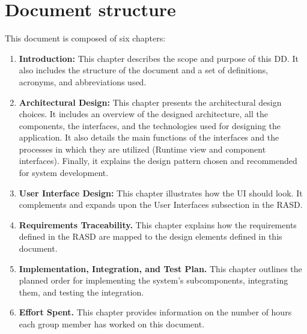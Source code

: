 \pagebreak
\section{Document structure}
This document is composed of six chapters:
\begin{enumerate}
    \item \textbf{ Introduction:} This chapter describes the scope and purpose of this DD. It also includes the structure of the document and a set of definitions, acronyms, and abbreviations used.
    \item \textbf{ Architectural Design:} This chapter presents the architectural design choices. It includes an overview of the designed architecture, all the components, the interfaces, and the technologies used for designing the application. It also details the main functions of the interfaces and the processes in which they are utilized (Runtime view and component interfaces). Finally, it explains the design pattern chosen and recommended for system development.
    \item \textbf{User Interface Design:} This chapter illustrates how the UI should look. It complements and expands upon the User Interfaces subsection in the RASD.
    \item \textbf{Requirements Traceability.} This chapter explains how the requirements defined in the RASD are mapped to the design elements defined in this document.
    \item \textbf{Implementation, Integration, and Test Plan.} This chapter outlines the planned order for implementing the system's subcomponents, integrating them, and testing the integration.
    \item \textbf{Effort Spent.} This chapter provides information on the number of hours each group member has worked on this document.
\end{enumerate}

